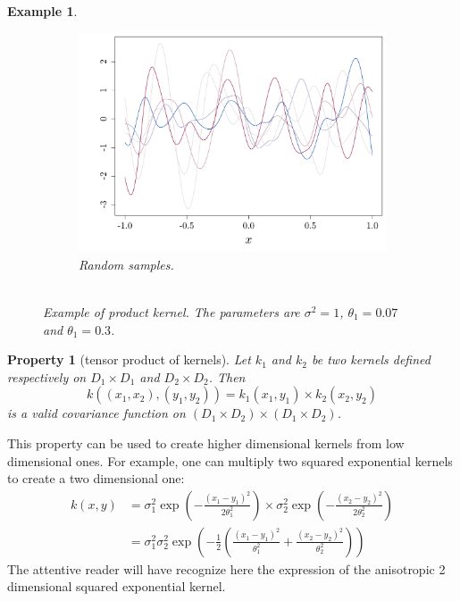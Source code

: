 \documentclass[twoside,openright]{report}
\newtheorem{property}{Property}
\newtheorem{example}{Example}
\begin{document}
\begin{example}
\begin{figure}[ht!]
\begin{subfigure}[t]{0.45\textwidth}
        \end{subfigure}%
        \hspace{1cm}       
        \begin{subfigure}[t]{0.45\textwidth}
                \includegraphics[width=\textwidth]{figures/ch5_prodSimu}
                \caption{Random samples. \\ \ }
        \end{subfigure}
        \caption{Example of product kernel. The parameters are $\sigma^2=1$, $\theta_1=0.07$ and $\theta_1=0.3$.}
        \label{fig:ch5product}
	\end{figure}
\end{example}

\begin{property}[tensor product of kernels]
	Let $k_1$ and $k_2$ be two kernels defined respectively on $D_1 \times D_1$ and $D_2 \times D_2$. Then 
	\begin{equation}
		k((x_1,x_2),(y_1,y_2)) = k_1(x_1,y_1) \times k_2(x_2,y_2)
	\end{equation}
	is a valid covariance function on $(D_1 \times D_2) \times (D_1 \times D_2)$.
\end{property}
This property can be used to create higher dimensional kernels from low dimensional ones. For example, one can multiply two squared exponential kernels to create a two dimensional one: 
\begin{equation}
\begin{split}
k(x,y) &= \sigma^2_1 \exp \left(- \frac{(x_1-y_1)^2}{2 \theta_1^2} \right) \times \sigma^2_2 \exp \left(- \frac{(x_2-y_2)^2}{2 \theta_2^2} \right)\\
& = \sigma^2_1 \sigma^2_2 \exp \left(-\frac12 \left( \frac{(x_1-y_1)^2}{\theta_1^2} + \frac{(x_2-y_2)^2}{\theta_2^2} \right) \right)
\end{split}
\end{equation}
 The attentive reader will have recognize here the expression of the anisotropic 2 dimensional squared exponential kernel. 
\end{document}
